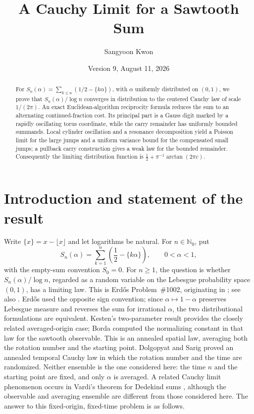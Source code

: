 \documentclass[11pt,a4paper]{amsart}
\title{A Cauchy Limit for a Sawtooth Sum}
\author{Sangyoon Kwon}
\date{Version 9, August 11, 2026}
\theoremstyle{definition}
\theoremstyle{remark}
\newcommand{\N}{\mathbb N}
\begin{document}
\begin{abstract}
For $S_n(\alpha)=\sum_{k\le n}(1/2-\{k\alpha\})$, with $\alpha$ uniformly distributed on $(0,1)$, we prove that $S_n(\alpha)/\log n$ converges in distribution to the centered Cauchy law of scale $1/(2\pi)$.  An exact Euclidean-algorithm reciprocity formula reduces the sum to an alternating continued-fraction cost.  Its principal part is a Gauss digit marked by a rapidly oscillating torus coordinate, while the carry remainder has uniformly bounded summands.  Local cylinder oscillation and a resonance decomposition yield a Poisson limit for the large jumps and a uniform variance bound for the compensated small jumps; a pullback carry construction gives a weak law for the bounded remainder.  Consequently the limiting distribution function is $\frac12+\pi^{-1}\arctan(2\pi c)$.
\end{abstract}

\maketitle

\section{Introduction and statement of the result}

Write $\{x\}=x-\lfloor x\rfloor$ and let logarithms be natural.  For
$n\in\N_0$, put
\[
 S_n(\alpha)=\sum_{k=1}^{n}\left(\frac12-\{k\alpha\}\right),
 \qquad 0<\alpha<1,
\]
with the empty-sum convention $S_0=0$.  For $n\ge1$, the question is whether
$S_n(\alpha)/\log n$, regarded as a random variable on
the Lebesgue probability space $(0,1)$, has a limiting law.  This is
Erd\H{o}s Problem~\#1002, originating in \cite{Er64b}; see also
\cite{Bloom1002}.  Erd\H{o}s used the opposite sign convention; since
$\alpha\mapsto1-\alpha$ preserves Lebesgue measure and reverses the
sum for irrational $\alpha$, the two distributional formulations are
equivalent.  Kesten's two-parameter result \cite{Ke60} provides the
closely related averaged-origin case; Borda \cite{Borda25} computed the
normalizing constant in that law for the sawtooth observable.  This is an
annealed spatial law, averaging both the rotation number and the starting
point.  Dolgopyat and Sarig \cite{DS20} proved an annealed temporal Cauchy
law in which the rotation number and the time are randomized.  Neither
ensemble is the one considered here: the time $n$ and the starting point are
fixed, and only $\alpha$ is averaged.  A related Cauchy limit phenomenon
occurs in Vardi's theorem for Dedekind sums \cite{Vardi93}, although the
observable and averaging ensemble are different from those considered here.
The answer to this
fixed-origin, fixed-time problem is as follows.
\end{document}
